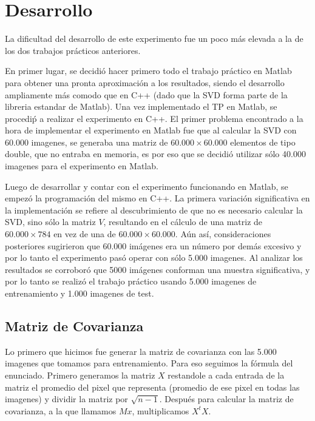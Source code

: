 \section{Desarrollo}
La dificultad del desarrollo de este experimento fue un poco m\'as elevada a la de los dos trabajos pr\'acticos anteriores. 

En primer lugar, se decidi\'o hacer primero todo el trabajo pr\'actico en Matlab para obtener una pronta aproximaci\'on a los resultados, siendo el desarrollo ampliamente m\'as comodo que en C++ (dado que la SVD forma parte de la libreria estandar de Matlab). Una vez implementado el TP en Matlab, se procedi\'p a realizar el experimento en C++. El primer problema encontrado a la hora de implementar el experimento en Matlab fue que al calcular la SVD con 60.000 imagenes, se generaba una matriz de $60.000 \times 60.000$ elementos de tipo double, que no entraba en memoria, es por eso que se decidi\'o utilizar s\'olo 40.000 imagenes para el experimento en Matlab.

Luego de desarrollar y contar con el experimento funcionando en Matlab, se empez\'o la programaci\'on del mismo en C++. La primera variaci\'on significativa en la implementaci\'on se refiere al descubrimiento de que no es necesario calcular la SVD, sino s\'olo la matriz $V$, resultando en el c\'alculo de una matriz de $60.000 \times 784$ en vez de una de $60.000 \times 60.000$. A\'un as\'i, consideraciones posteriores sugirieron que 60.000 im\'agenes era un n\'umero por dem\'as excesivo y por lo tanto el experimento pas\'o operar con s\'olo 5.000 imagenes. Al analizar los resultados se corrobor\'o que 5000 im\'agenes conforman una muestra significativa, y por lo tanto se realiz\'o el trabajo pr\'actico usando 5.000 imagenes de entrenamiento y 1.000 imagenes de test.

\subsection{Matriz de Covarianza}
Lo primero que hicimos fue generar la matriz de covarianza con las 5.000 imagenes que tomamos para entrenamiento. Para eso seguimos la f\'ormula del enunciado. Primero generamos la matriz $X$ restandole a cada entrada de la matriz el promedio del pixel que representa (promedio de ese pixel en todas las imagenes) y dividir la matriz por $\sqrt{n-1}$. Despu\'es para calcular la matriz de covarianza, a la que llamamos $Mx$, multiplicamos $X^tX$.

